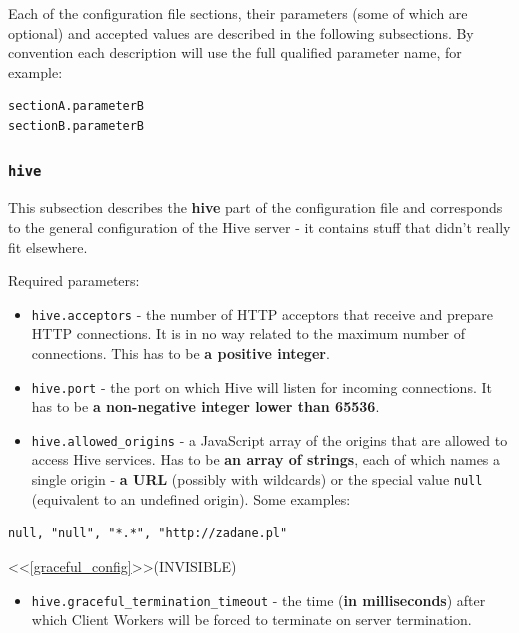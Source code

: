\documentclass[a4paper]{article}
\begin{document}
Each of the configuration file sections, their parameters (some of which are optional) and accepted values are described in the following subsections. By convention each description will use the full qualified parameter name, for example:


\begin{verbatim}
sectionA.parameterB
sectionB.parameterB
\end{verbatim}
\subsubsection{\texttt{hive}}
\label{sec-3-1-1}

This subsection describes the \textbf{hive} part of the configuration file and corresponds to the general configuration of the Hive server - it contains stuff that didn't really fit elsewhere.

\noindent
Required parameters:

\begin{itemize}
\item \texttt{hive.acceptors} - the number of HTTP acceptors that receive and prepare HTTP connections. It is in no way related to the maximum number of connections. This has to be \textbf{a positive integer}.
\item \texttt{hive.port} - the port on which Hive will listen for incoming connections. It has to be \textbf{a non-negative integer lower than 65536}.
\item \texttt{hive.allowed\_origins} - a JavaScript array of the origins that are allowed to access Hive services. Has to be \textbf{an array of strings}, each of which names a single origin - \textbf{a URL} (possibly with wildcards) or the special value \texttt{null} (equivalent to an undefined origin). Some examples:
\end{itemize}


\begin{verbatim}
null, "null", "*.*", "http://zadane.pl"
\end{verbatim}




<<\ref{graceful_config}>>(INVISIBLE)

\begin{itemize}
\item \texttt{hive.graceful\_termination\_timeout} - the time (\textbf{in milliseconds}) after which Client Workers will be forced to terminate on server termination.
\end{itemize}
\end{document}
